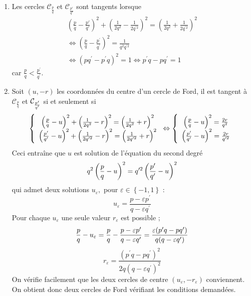 \begin{enumerate}
\item  Les cercles $\mathcal{C}_{\frac{p}{q}}$ et $\mathcal{C}_{\frac{p'}{q'}}$ sont tangents lorsque
\begin{multline*}
\left( \frac{p}{q}-\frac{p'}{q'}\right) ^{2}+\left( \frac{1}{2q^{2}}-\frac{1}{2q^{\prime 2}}\right) ^{2} = \left(\frac{1}{2q^{2}}+\frac{1}{2q^{\prime 2}}\right) ^{2} \\
 \Leftrightarrow
\left( \frac{p}{q}-\frac{p^{\prime }}{q^{\prime }}\right) ^{2} = \frac{1}{q^{2}q^{\prime 2}} \\
 \Leftrightarrow 
\left( pq^{\prime }-p^{\prime }q\right)^{2}=1 
  \Leftrightarrow
p^{\prime }q-pq^{\prime } = 1
\end{multline*}
car $\frac{p}{q}<\frac{p^{\prime }}{q^{\prime }}$.
\item  Soit $(u,-r)$ les coordonn{\'e}es du centre d'un cercle de Ford, il
est tangent {\`a} $\mathcal{C}_{\frac{p}{q}}$ et $\mathcal{C}_{\frac{p^{\prime }}{%
q^{\prime }}}$ si et seulement si
\[
\left\{
\begin{array}{c}
\left( \frac{p}{q}-u\right) ^{2}+\left( \frac{1}{2q^{2}}-r\right)
^{2}=\left( \frac{1}{2q^{2}}+r\right) ^{2} \\
\left( \frac{p^{\prime }}{q^{\prime }}-u\right) ^{2}+\left( \frac{1}{%
2q^{\prime 2}}-r\right) ^{2}=\left( \frac{1}{2q^{\prime 2}}+r\right) ^{2}
\end{array}
\right. \Leftrightarrow \left\{
\begin{array}{c}
\left( \frac{p}{q}-u\right) ^{2}=\frac{2r}{q^{2}} \\
\left( \frac{p^{\prime }}{q^{\prime }}-u\right) ^{2}=\frac{2r}{q^{\prime 2}}
\end{array}
\right.
\]
Ceci entra\^{i}ne que $u$ est solution de l'{\'e}quation du second degr{\'e}
\[
q^{2}\left( \frac{p}{q}-u\right) ^{2}=q^{\prime 2}\left( \frac{p^{\prime }}{%
q^{\prime }}-u\right) ^{2}
\]
qui admet deux solutions $u_{\varepsilon },$ pour $\varepsilon \in \left\{
-1,1\right\} $ :
\[
u_{\varepsilon }=\frac{p-\varepsilon p^{\prime }}{q-\varepsilon q^{\prime }}
\]
Pour chaque $u_{\varepsilon }$ une seule valeur $r_{\varepsilon }$ est
possible ;
\[
\frac{p}{q}-u_{\varepsilon }=\frac{p}{q}-\frac{p-\varepsilon p^{\prime }}{%
q-\varepsilon q^{\prime }}=\frac{\varepsilon (p^{\prime }q-pq^{\prime })}{%
q(q-\varepsilon q^{\prime })}
\]
\[
r_{\varepsilon }=\frac{(p^{\prime }q-pq^{\prime })^{2}}{2q(q-\varepsilon
q^{\prime })^{2}}
\]
On v{\'e}rifie facilement que les deux cercles de centre $(u_{\varepsilon
},-r_{\varepsilon })$ conviennent. On obtient donc deux cercles de Ford
v{\'e}rifiant les conditions demand{\'e}es.


\end{enumerate}
